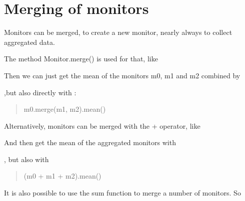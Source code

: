 \documentclass[letterpaper,10pt,english]{sphinxmanual}
\begin{document}
\section{Merging of monitors}
\label{\detokenize{Monitor:merging-of-monitors}}
Monitors can be merged, to create a new monitor, nearly always to collect aggregated data.

The method Monitor.merge() is used for that, like

\begin{sphinxVerbatim}[commandchars=\\\{\}]
   
\end{sphinxVerbatim}

Then we can just get the mean of the monitors m0, m1 and m2 combined by

\begin{sphinxVerbatim}[commandchars=\\\{\}]
\end{sphinxVerbatim}

,but also directly with :
\begin{quote}

m0.merge(m1, m2).mean()
\end{quote}

Alternatively, monitors can be merged with the + operator, like

\begin{sphinxVerbatim}[commandchars=\\\{\}]
      
\end{sphinxVerbatim}

And then get the mean of the aggregated monitors with

\begin{sphinxVerbatim}[commandchars=\\\{\}]
\end{sphinxVerbatim}

, but also with
\begin{quote}

(m0 + m1 + m2).mean()
\end{quote}

It is also possible to use the sum function to merge a number of monitors. So

\begin{sphinxVerbatim}[commandchars=\\\{\}]
  
\end{sphinxVerbatim}
\end{document}
